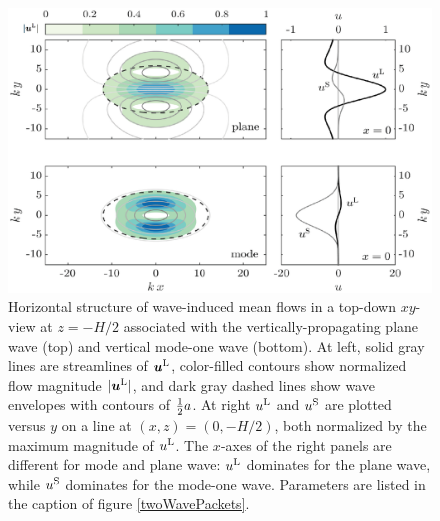 \documentclass[12pt, oneside]{book}
\begin{document}
\begin{figure}[H]
\centering
\includegraphics[width = 1\textwidth]{inducedFlow_xy}
\caption[Horizontal structure of wave-induced mean flows]{Horizontal structure of wave-induced mean flows in a top-down $xy$-view at $z=- H/2$ associated with the vertically-propagating plane wave (top) and vertical mode-one wave (bottom).  At left, solid gray lines are streamlines of $\boldsymbol{u}^{\mathrm{L}}$,  color-filled contours show normalized flow magnitude $| \boldsymbol{u}^{\mathrm{L}} |$, and dark gray dashed lines show wave envelopes with contours of $\tfrac{1}{2} a$.  At right $u^{\mathrm{L}}$ and $u^{\mathrm{S}}$ are plotted versus $y$ on a line at $(x,z)=(0,-H/2)$, both normalized by the maximum magnitude of $u^{\mathrm{L}}$.  The $x$-axes of the right panels are different for mode and plane wave: $u^{\mathrm{L}}$ dominates for the plane wave, while $u^{\mathrm{S}}$ dominates for the mode-one wave.  Parameters are listed in the caption of figure \ref{twoWavePackets}.}
\label{inducedFlow_xy}
\end{figure}
\end{document}
